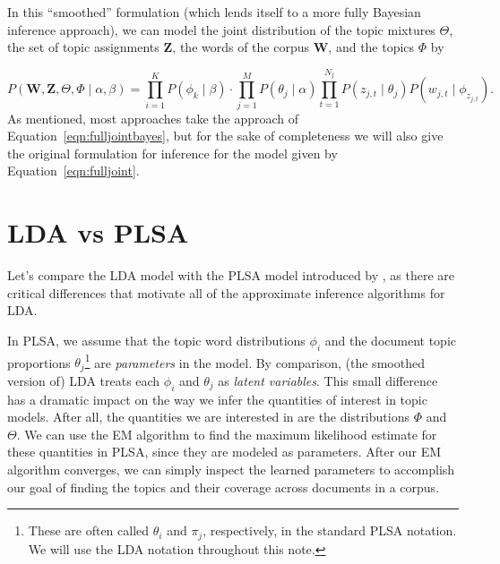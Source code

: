 \documentclass[11pt]{article}
\begin{document}
In this ``smoothed'' formulation (which lends itself to a more fully
Bayesian inference approach), we can model the joint distribution of the
topic mixtures $\Theta$, the set of topic assignments $\mathbf{Z}$, the
words of the corpus $\mathbf{W}$, and the topics $\Phi$ by

\begin{equation}
  P(\mathbf{W}, \mathbf{Z}, \Theta, \Phi \mid \alpha, \beta)
  = \prod_{i=1}^K P(\phi_k \mid \beta) \cdot \prod_{j=1}^M P(\theta_j \mid
  \alpha) \prod_{t=1}^{N_j} P(z_{j,t} \mid \theta_j) P(w_{j,t} \mid
  \phi_{z_{j,t}}).
  \label{eqn:fulljointbayes}
\end{equation}
As mentioned, most approaches take the approach of
Equation~\ref{eqn:fulljointbayes}, but for the sake of completeness we will
also give the original formulation for inference for the model given by
Equation~\ref{eqn:fulljoint}.

\section{LDA vs PLSA}
Let's compare the LDA model with the PLSA model introduced by
\citet{Hofmann:1999:UAI}, as there are critical differences that motivate
all of the approximate inference algorithms for LDA.

In PLSA, we assume that the topic word distributions
$\phi_i$ and the document topic proportions $\theta_j$\footnote{These are
often called $\theta_i$ and $\pi_j$, respectively, in the standard PLSA
notation. We will use the LDA notation throughout this note.} are
\emph{parameters} in the model. By comparison, (the smoothed version of)
LDA treats each $\phi_i$ and $\theta_j$ as \emph{latent variables}. This
small difference has a dramatic impact on the way we infer the quantities
of interest in topic models. After all, the quantities we are interested in
are the distributions $\Phi$ and $\Theta$. We can use the EM algorithm to
find the maximum likelihood estimate for these quantities in PLSA, since
they are modeled as parameters. After our EM algorithm converges, we can
simply inspect the learned parameters to accomplish our goal of finding the
topics and their coverage across documents in a corpus.
\end{document}
